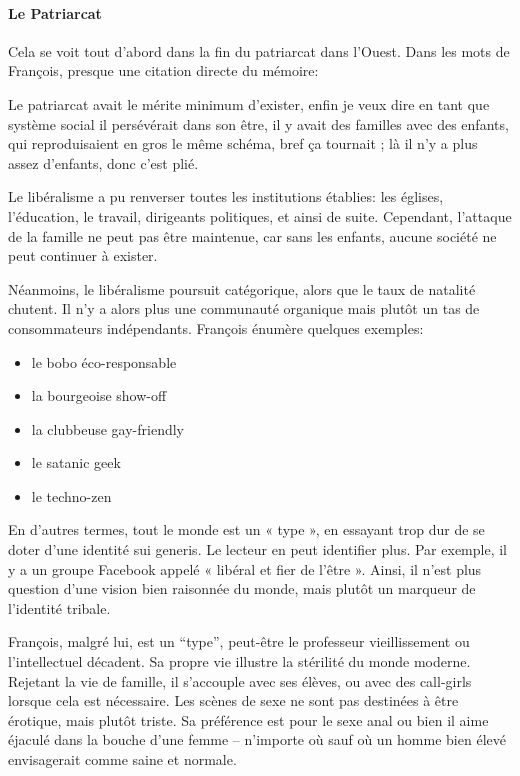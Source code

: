 \paragraph{Le Patriarcat}


Cela se voit tout d'abord dans la fin du patriarcat dans l'Ouest. Dans les mots de François, presque une citation directe du mémoire:

\begin{quotex}
Le patriarcat avait le mérite minimum d'exister, enfin je veux dire en tant que système social il persévérait dans son être, il y avait des familles avec des enfants, qui reproduisaient en gros le même schéma, bref ça tournait ; là il n'y a plus assez d'enfants, donc c'est plié.
\end{quotex}


Le libéralisme a pu renverser toutes les institutions établies: les églises, l'éducation, le travail, dirigeants politiques, et ainsi de suite. Cependant, l'attaque de la famille ne peut pas être maintenue, car sans les enfants, aucune société ne peut continuer à exister.

Néanmoins, le libéralisme poursuit catégorique, alors que le taux de natalité chutent. Il n'y a alors plus une communauté organique mais plutôt un tas de consommateurs indépendants. François énumère quelques exemples:

\begin{itemize}


\item le bobo éco-responsable

\item la bourgeoise show-off

\item la clubbeuse gay-friendly

\item le satanic geek

\item le techno-zen
\end{itemize}


En d'autres termes, tout le monde est un « type », en essayant trop dur de se doter d'une identité sui generis. Le lecteur en peut identifier plus. Par exemple, il y a un groupe Facebook appelé « libéral et fier de l'être ». Ainsi, il n'est plus question d'une vision bien raisonnée du monde, mais plutôt un marqueur de l'identité tribale.

François, malgré lui, est un ``type'', peut-être le professeur vieillissement ou l'intellectuel décadent. Sa propre vie illustre la stérilité du monde moderne. Rejetant la vie de famille, il s'accouple avec ses élèves, ou avec des call-girls lorsque cela est nécessaire. Les scènes de sexe ne sont pas destinées à être érotique, mais plutôt triste. Sa préférence est pour le sexe anal ou bien il aime éjaculé dans la bouche d'une femme -- n'importe où sauf où un homme bien élevé envisagerait comme saine et normale.

